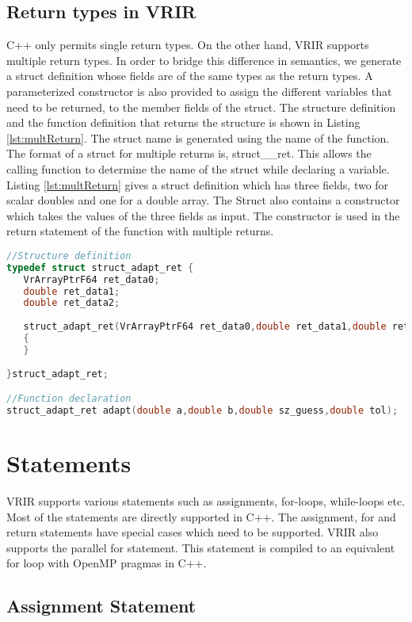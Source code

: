 \subsection{Return types in VRIR}
\label{subsec:multreturn}
C++ only permits single return types. On the other hand, VRIR supports multiple return types. In order to bridge this difference in semantics, we generate a struct definition whose fields are of the same types as the return types. A parameterized constructor is also provided to assign the different variables that need to be returned, to the member fields of the struct. The structure definition and the function definition that returns the structure is shown in Listing \ref{lst:multReturn}. The struct name is generated using the name of the function. The format of a struct for multiple returns is, struct\_<function name>\_ret. This allows the calling function to determine the name of the struct while declaring a variable. Listing \ref{lst:multReturn} gives a struct definition which has three fields, two for scalar doubles and one for a double array. The Struct also contains a constructor which takes the values of the three fields as input. The constructor is used in the return statement of the function with multiple returns.
\begin{lstlisting}[language=c,caption={Generated structure to handle multiple returns.},label={lst:multReturn}]
//Structure definition
typedef struct struct_adapt_ret { 
   VrArrayPtrF64 ret_data0;
   double ret_data1;
   double ret_data2;
   
   struct_adapt_ret(VrArrayPtrF64 ret_data0,double ret_data1,double ret_data2) :ret_data0(ret_data0),ret_data1(ret_data1),ret_data2(ret_data2)
   {
   }
   
}struct_adapt_ret;

//Function declaration
struct_adapt_ret adapt(double a,double b,double sz_guess,double tol);
\end{lstlisting}
\section{Statements}
VRIR supports various statements such as assignments, for-loops, while-loops etc. Most of the statements are directly supported in C++. The assignment, for and return statements have special cases which need to be supported. VRIR also supports the parallel for statement. This statement is compiled to an equivalent for loop with OpenMP pragmas in C++.
\subsection{Assignment Statement}

